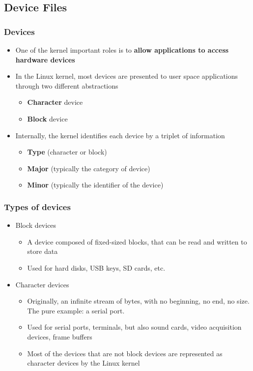 \subsection{Device Files}
\begin{frame}
  \frametitle{Devices}
  \begin{itemize}
  \item One of the kernel important roles is to {\bf allow applications
      to access hardware devices}
  \item In the Linux kernel, most devices are presented to user space
    applications through two different abstractions
    \begin{itemize}
    \item {\bf Character} device
    \item {\bf Block} device
    \end{itemize}
  \item Internally, the kernel identifies each device by a triplet of
    information
    \begin{itemize}
    \item {\bf Type} (character or block)
    \item {\bf Major} (typically the category of device)
    \item {\bf Minor} (typically the identifier of the device)
    \end{itemize}
  \end{itemize}
\end{frame}

\begin{frame}
  \frametitle{Types of devices}
  \begin{itemize}
  \item Block devices
    \begin{itemize}
    \item A device composed of fixed-sized blocks, that can be read
      and written to store data
    \item Used for hard disks, USB keys, SD cards, etc.
    \end{itemize}
  \item Character devices
    \begin{itemize}
    \item Originally, an infinite stream of bytes, with no beginning,
      no end, no size. The pure example: a serial port.
    \item Used for serial ports, terminals, but also sound cards,
      video acquisition devices, frame buffers
    \item Most of the devices that are not block devices are
      represented as character devices by the Linux kernel
    \end{itemize}
  \end{itemize}
\end{frame}
